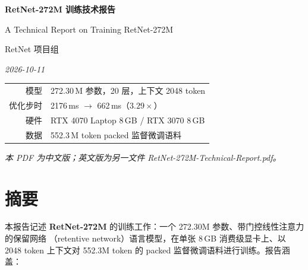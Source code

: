 \thispagestyle{empty}

\begin{center}
\vspace*{3.2cm}

{\LARGE\bfseries RetNet-272M 训练技术报告}

\vspace{0.55cm}

{\large A Technical Report on Training RetNet-272M}

\vspace{1.1cm}

{\normalsize RetNet 项目组}

\vspace{0.25cm}

{\small\itshape 2026-10-11}

\vspace{2.2cm}

\begin{minipage}{0.80\textwidth}
\centering\small
\begin{tabular}{@{}rl@{}}
\toprule
模型 & 272.30\,M 参数，20 层，上下文 2048 token \\
优化步时 & 2176\,ms $\rightarrow$ 662\,ms（$3.29\times$） \\
硬件 & RTX 4070 Laptop 8\,GB / RTX 3070 8\,GB \\
数据 & 552.3\,M token packed 监督微调语料 \\
\bottomrule
\end{tabular}
\end{minipage}

\vfill

{\small\itshape 本 PDF 为中文版；英文版为另一文件 RetNet-272M-Technical-Report.pdf。}

\vspace{1.2cm}
\end{center}

\clearpage

\section*{摘要}

本报告记述 \textbf{RetNet-272M} 的训练工作：一个 272.30M 参数、带门控线性注意力的保留网络
（retentive network）语言模型，在单张 8\,GB 消费级显卡上、以 2048 token 上下文对
552.3M token 的 packed 监督微调语料进行训练。报告涵盖：

